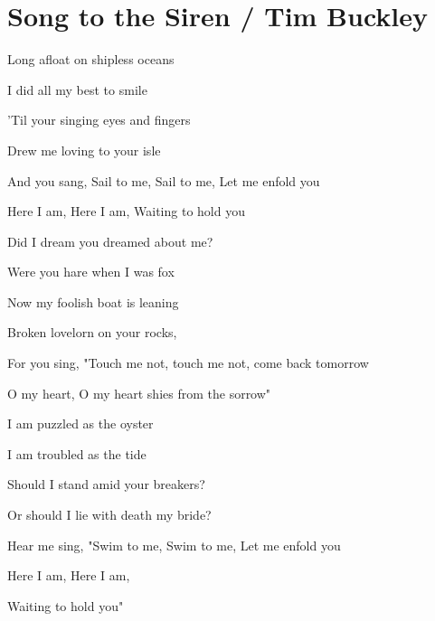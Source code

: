 \section{Song to the Siren / Tim Buckley}\label{sec:songtothesiren}

\Gmajor
\Dmajor
\Cmajor
\Eminor
\Fmajor

Long afloat on shipless oceans

I did all my best to smile

'Til your singing eyes and fingers

Drew me loving to your isle

And you sang, Sail to me, Sail to me, Let me enfold you                        

Here I am, Here I am, Waiting to hold you

Did I dream you dreamed about me?

Were you hare when I was fox

Now my foolish boat is leaning 

Broken lovelorn on your rocks,

For you sing, "Touch me not, touch me not, come back tomorrow

O my heart, O my heart shies from the sorrow" 

I am puzzled as the oyster

I am troubled as the tide

Should I stand amid your breakers?

Or should I lie with death my bride?

Hear me sing, "Swim to me, Swim to me, Let me enfold you

Here I am, Here I am, 

Waiting to hold you"

